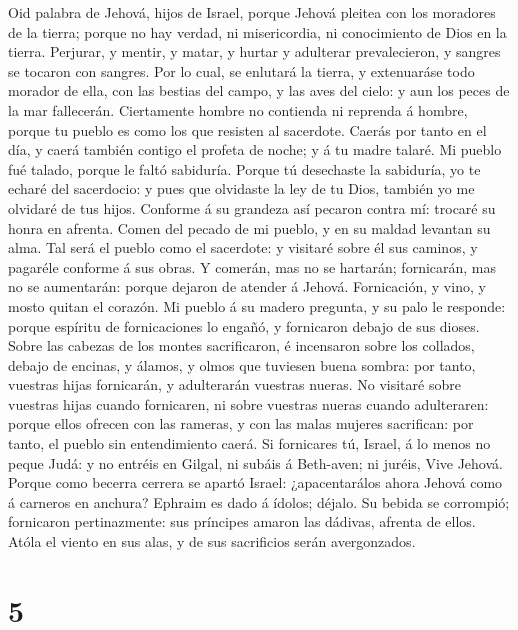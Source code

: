  Oid palabra de Jehová, hijos de Israel, porque Jehová
pleitea con los moradores de la tierra; porque no hay verdad, ni
misericordia, ni conocimiento de Dios en la tierra. 
Perjurar, y mentir, y matar, y hurtar y adulterar prevalecieron, y
sangres se tocaron con sangres.  Por lo cual, se enlutará
la tierra, y extenuaráse todo morador de ella, con las bestias del
campo, y las aves del cielo: y aun los peces de la mar fallecerán.
 Ciertamente hombre no contienda ni reprenda á hombre,
porque tu pueblo es como los que resisten al sacerdote. 
Caerás por tanto en el día, y caerá también contigo el profeta de noche;
y á tu madre talaré.  Mi pueblo fué talado, porque le
faltó sabiduría. Porque tú desechaste la sabiduría, yo te echaré del
sacerdocio: y pues que olvidaste la ley de tu Dios, también yo me
olvidaré de tus hijos.  Conforme á su grandeza así pecaron
contra mí: trocaré su honra en afrenta.  Comen del pecado
de mi pueblo, y en su maldad levantan su alma.  Tal será
el pueblo como el sacerdote: y visitaré sobre él sus caminos, y pagaréle
conforme á sus obras.  Y comerán, mas no se hartarán;
fornicarán, mas no se aumentarán: porque dejaron de atender á Jehová.
 Fornicación, y vino, y mosto quitan el corazón.
 Mi pueblo á su madero pregunta, y su palo le responde:
porque espíritu de fornicaciones lo engañó, y fornicaron debajo de sus
dioses.  Sobre las cabezas de los montes sacrificaron, é
incensaron sobre los collados, debajo de encinas, y álamos, y olmos que
tuviesen buena sombra: por tanto, vuestras hijas fornicarán, y
adulterarán vuestras nueras.  No visitaré sobre vuestras
hijas cuando fornicaren, ni sobre vuestras nueras cuando adulteraren:
porque ellos ofrecen con las rameras, y con las malas mujeres
sacrifican: por tanto, el pueblo sin entendimiento caerá.
 Si fornicares tú, Israel, á lo menos no peque Judá: y no
entréis en Gilgal, ni subáis á Beth-aven; ni juréis, Vive Jehová.
 Porque como becerra cerrera se apartó Israel:
¿apacentarálos ahora Jehová como á carneros en anchura? 
Ephraim es dado á ídolos; déjalo.  Su bebida se
corrompió; fornicaron pertinazmente: sus príncipes amaron las dádivas,
afrenta de ellos.  Atóla el viento en sus alas, y de sus
sacrificios serán avergonzados.

\hypertarget{section-4}{%
\section{5}\label{section-4}}

